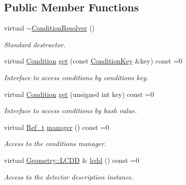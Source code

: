 \subsection*{Public Member Functions}
\begin{DoxyCompactItemize}
\item 
virtual \hyperlink{class_d_d4hep_1_1_conditions_1_1_condition_resolver_abb26bddb3600ca97c9b40cc3a3ad1d40}{$\sim$ConditionResolver} ()
\begin{DoxyCompactList}\small\item\em Standard destructor. \item\end{DoxyCompactList}\item 
virtual \hyperlink{class_d_d4hep_1_1_conditions_1_1_condition}{Condition} \hyperlink{class_d_d4hep_1_1_conditions_1_1_condition_resolver_a8d33b49336349b3cf4877244572f1827}{get} (const \hyperlink{class_d_d4hep_1_1_conditions_1_1_condition_key}{ConditionKey} \&key) const =0
\begin{DoxyCompactList}\small\item\em Interface to access conditions by conditions key. \item\end{DoxyCompactList}\item 
virtual \hyperlink{class_d_d4hep_1_1_conditions_1_1_condition}{Condition} \hyperlink{class_d_d4hep_1_1_conditions_1_1_condition_resolver_ac321d32bbe1d5e777859c2490c68b571}{get} (unsigned int key) const =0
\begin{DoxyCompactList}\small\item\em Interface to access conditions by hash value. \item\end{DoxyCompactList}\item 
virtual \hyperlink{class_d_d4hep_1_1_handle}{Ref\_\-t} \hyperlink{class_d_d4hep_1_1_conditions_1_1_condition_resolver_ab8c95a13c7c20b35ab746e6fcc8c420f}{manager} () const =0
\begin{DoxyCompactList}\small\item\em Access to the conditions manager. \item\end{DoxyCompactList}\item 
virtual \hyperlink{class_d_d4hep_1_1_geometry_1_1_l_c_d_d}{Geometry::LCDD} \& \hyperlink{class_d_d4hep_1_1_conditions_1_1_condition_resolver_a9413afdddefecd04036fd7f7b8356fca}{lcdd} () const =0
\begin{DoxyCompactList}\small\item\em Access to the detector description instance. \item\end{DoxyCompactList}\item 

\end{DoxyCompactItemize}
